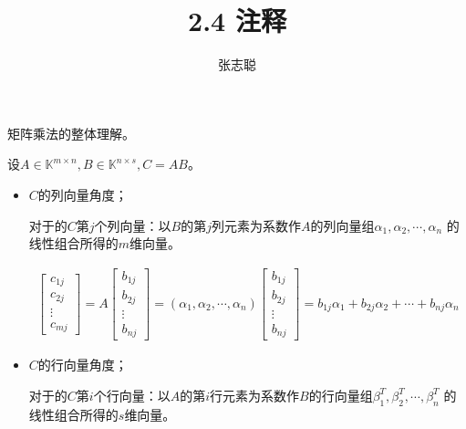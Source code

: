 \documentclass{article}
\begin{document}
\title{2.4 注释}
\author{张志聪}
\maketitle

\begin{zremark}
  矩阵乘法的整体理解。
\end{zremark}

设$A \in \mathbb{K}^{m \times n}, B \in \mathbb{K}^{n \times s}, C = AB$。
\begin{itemize}
  \item $C$的列向量角度；

        对于的$C$第$j$个列向量：以$B$的第$j$列元素为系数作$A$的列向量组$\alpha_1, \alpha_2, \cdots, \alpha_n$
        的线性组合所得的$m$维向量。

        \begin{align*}
          \begin{bmatrix}
            c_{1j} \\
            c_{2j} \\
            \vdots \\
            c_{mj}
          \end{bmatrix}
          =
          A \begin{bmatrix}
              b_{1j} \\
              b_{2j} \\
              \vdots \\
              b_{nj}
            \end{bmatrix}
          =
          (\alpha_1, \alpha_2, \cdots, \alpha_n)\begin{bmatrix}
                                                  b_{1j} \\
                                                  b_{2j} \\
                                                  \vdots \\
                                                  b_{nj}
                                                \end{bmatrix}
          = b_{1j} \alpha_1 + b_{2j} \alpha_2 + \cdots + b_{nj} \alpha_n
        \end{align*}

  \item $C$的行向量角度；

        对于的$C$第$i$个行向量：以$A$的第$i$行元素为系数作$B$的行向量组$\beta_1^T, \beta_2^T, \cdots, \beta_n^T$
        的线性组合所得的$s$维向量。


\end{itemize}
\end{document}
